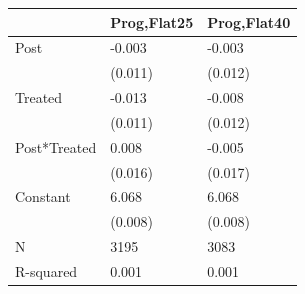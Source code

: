\begin{tabular}{lll}
\toprule
 & Prog,Flat25 & Prog,Flat40 \\
\midrule
Post & -0.003 & -0.003 \\
 & (0.011) & (0.012) \\
Treated & -0.013 & -0.008 \\
 & (0.011) & (0.012) \\
Post*Treated & 0.008 & -0.005 \\
 & (0.016) & (0.017) \\
Constant & 6.068 & 6.068 \\
 & (0.008) & (0.008) \\
N & 3195 & 3083 \\
R-squared & 0.001 & 0.001 \\
\bottomrule
\end{tabular}
